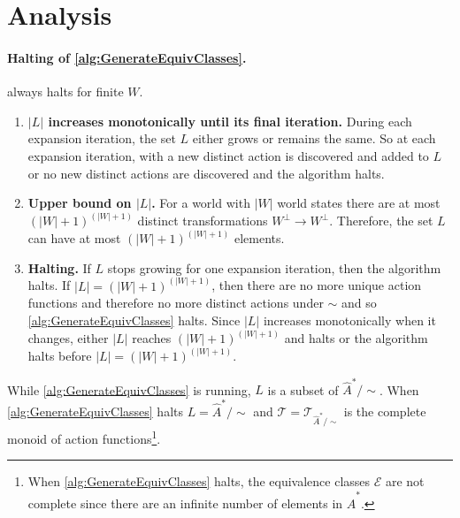 \section{
Analysis
}

\paragraph{Halting of \cref{alg:GenerateEquivClasses}.}

\begin{propositionE}
     always halts for finite $W$.
\end{propositionE}
\begin{proofE}
\begin{enumerate}
    \item \textbf{$|L|$ increases monotonically until its final iteration.}
    During each expansion iteration, the set $L$ either grows or remains the same.
    So at each expansion iteration, with a new distinct action is discovered and added to $L$ or no new distinct actions are discovered and the algorithm halts.

    \item \textbf{Upper bound on $|L|$.}
    For a world with $|W|$ world states there are at most $(|W| + 1)^{(|W| + 1)}$ distinct transformations $W^{\bot} \to W^{\bot}$.
    Therefore, the set $L$ can have at most $(|W| + 1)^{(|W| + 1)}$ elements.

    \item \textbf{Halting.}
    If $L$ stops growing for one expansion iteration, then the algorithm halts.
    If $|L| = (|W| + 1)^{(|W| + 1)}$, then there are no more unique action functions and therefore no more distinct actions under $\sim$ and so \cref{alg:GenerateEquivClasses} halts.
    Since $|L|$ increases monotonically when it changes, either $|L|$ reaches $(|W| + 1)^{(|W| + 1)}$ and halts or the algorithm halts before $|L| = (|W| + 1)^{(|W| + 1)}$.
\end{enumerate}
\end{proofE}

While \cref{alg:GenerateEquivClasses} is running, $L$ is a subset of $\hat{A}^{*}/\sim$.
When \cref{alg:GenerateEquivClasses} halts $L = \hat{A}^{*}/\sim$ and $\mathcal{T} = \mathcal{T}_{\hat{A}^{*}/\sim}$ is the complete monoid of action functions\footnote{
When \cref{alg:GenerateEquivClasses} halts, the equivalence classes $\mathcal{E}$ are not complete since there are an infinite number of elements in $\hat{A}^{*}$.
}.

